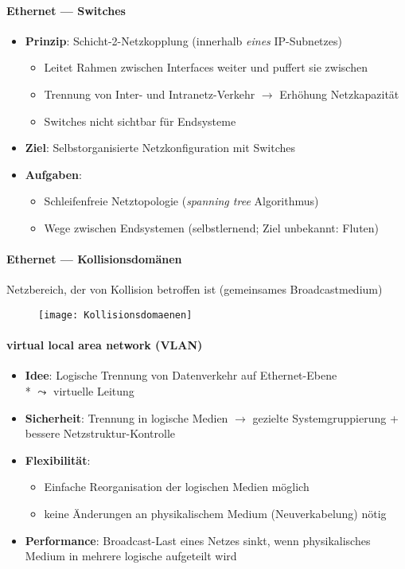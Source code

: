 \paragraph{Ethernet --- Switches}
\begin{itemize}
  \item \textbf{Prinzip}: Schicht-2-Netzkopplung (innerhalb \emph{eines} IP-Subnetzes)
  \begin{itemize}
    \item Leitet Rahmen zwischen Interfaces weiter und puffert sie zwischen
    \item Trennung von Inter- und Intranetz-Verkehr \( \to \) Erhöhung Netzkapazität
    \item Switches nicht sichtbar für Endsysteme
  \end{itemize}
  \item \textbf{Ziel}: Selbstorganisierte Netzkonfiguration mit Switches
  \item \textbf{Aufgaben}:
  \begin{itemize}
    \item Schleifenfreie Netztopologie (\emph{spanning tree} Algorithmus)
    \item Wege zwischen Endsystemen (selbstlernend; Ziel unbekannt: Fluten)
  \end{itemize}
\end{itemize}

\paragraph{Ethernet --- Kollisionsdomänen}
Netzbereich, der von Kollision betroffen ist (gemeinsames Broadcastmedium)
\begin{figure}[H]\centering\texttt{[image: Kollisionsdomaenen]}\end{figure}

\paragraph{virtual local area network (VLAN)}
\begin{itemize}
  \item \textbf{Idee}: Logische Trennung von Datenverkehr auf Ethernet-Ebene \\* \( \leadsto \) virtuelle Leitung
  \item \textbf{Sicherheit}: Trennung in logische Medien \( \to \) gezielte Systemgruppierung + bessere Netzstruktur-Kontrolle
  \item \textbf{Flexibilität}:
  \begin{itemize}
    \item Einfache Reorganisation der logischen Medien möglich
    \item keine Änderungen an physikalischem Medium (Neuverkabelung) nötig
  \end{itemize}
  \item \textbf{Performance}: Broadcast-Last eines Netzes sinkt, wenn physikalisches Medium in mehrere logische aufgeteilt wird
\end{itemize}

